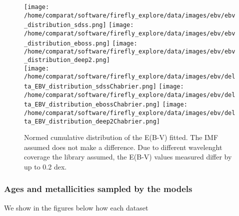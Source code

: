 \documentclass[onecolumn]{aa}
\begin{document}
\begin{figure}
\begin{center}
\caption{\label{fig:distributions:EBV} 
Normed cumulative distribution of the E(B-V) fitted. The IMF assumed does not make a difference. Due to different wavelenght coverage the library assumed, the E(B-V) values measured differ by up to 0.2 dex.}  
\texttt{[image: /home/comparat/software/firefly\_explore/data/images/ebv/ebv\_distribution\_sdss.png]}
\texttt{[image: /home/comparat/software/firefly\_explore/data/images/ebv/ebv\_distribution\_eboss.png]}          
\texttt{[image: /home/comparat/software/firefly\_explore/data/images/ebv/ebv\_distribution\_deep2.png]} \\
\texttt{[image: /home/comparat/software/firefly\_explore/data/images/ebv/delta\_EBV\_distribution\_sdssChabrier.png]}
\texttt{[image: /home/comparat/software/firefly\_explore/data/images/ebv/delta\_EBV\_distribution\_ebossChabrier.png]}
\texttt{[image: /home/comparat/software/firefly\_explore/data/images/ebv/delta\_EBV\_distribution\_deep2Chabrier.png]}
\end{center}
\end{figure}


\subsubsection{Ages and metallicities sampled by the models}
We show in the figures below how each dataset 
\end{document}

